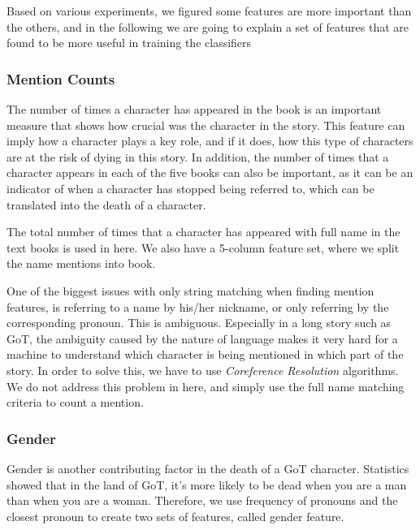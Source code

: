 \documentclass[letterpaper]{article}
\begin{document}
Based on various experiments, we figured some features are more important than the others, and in the following we are going to explain a set of features that are found to be more useful in training the classifiers


\subsubsection{Mention Counts}
The number of times a character has appeared in the book is an important measure that shows how crucial was the character in the story. This feature can imply how a character plays a key role, and if it does, how this type of characters are at the risk of dying in this story. In addition, the number of times that a character appears in each of the five books can also be important, as it can be an indicator of when a character has stopped being referred to, which can be translated into the death of a character.

The total number of times that a character has appeared with full name in the text books is used in here. We also have a 5-column feature set, where we split the name mentions into book. 

One of the biggest issues with only string matching when finding mention features, is referring to a name by his/her nickname, or only referring by the corresponding pronoun. This is ambiguous. Especially in a long story such as GoT, the ambiguity caused by the nature of language makes it very hard for a machine to understand which character is being mentioned in which part of the story. In order to solve this, we have to use \textit{Coreference Resolution} algorithms. We do not address this problem in here, and simply use the full name matching criteria to count a mention.

\subsubsection{Gender}
Gender is another contributing factor in the death of a GoT character. Statistics showed that in the land of GoT, it's more likely to be dead when you are a man than when you are a woman. Therefore, we use frequency of pronouns and the closest pronoun to create two sets of features, called gender feature.
\end{document}
